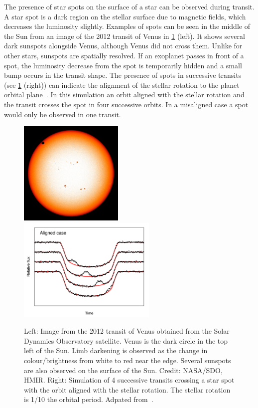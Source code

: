 The presence of star spots on the surface of a star can be observed during transit.
A star spot is a dark region on the stellar surface due to magnetic fields, which decreases the luminosity slightly.
Examples of spots can be seen in the middle of the Sun from an image of the 2012 transit of Venus in \cref{fig:transit_venus_transit_alignment} (left).
It shows several dark sunspots alongside Venus, although Venus did not cross them.
Unlike for other stars, sunspots are spatially resolved.
If an exoplanet passes in front of a spot, the luminosity decrease from the spot is temporarily hidden and a small bump occurs in the transit shape.
The presence of spots in successive transits (see \cref{fig:transit_venus_transit_alignment} (right)) can indicate the alignment of the stellar rotation to the planet orbital plane~\citep{sanchis-ojeda_starspots_2013}.
In this simulation an orbit aligned with the stellar rotation and the transit crosses the spot in four successive orbits.
In a misaligned case a spot would only be observed in one transit.

\begin{figure}
    \centering
    \includegraphics[height=5cm]{./figures/introduction/SDO_2012_Venus_Transit.jpg}
    \includegraphics[height=5cm]{figures/introduction/sanchisojedafig1-crop.pdf}
    \caption{Left: Image from the 2012 transit of Venus obtained from the Solar Dynamics Observatory satellite.
        Venus is the dark circle in the top left of the Sun.
        Limb darkening is observed as the change in colour/brightness from white to red near the edge.
        Several sunspots are also observed on the surface of the Sun.
        Credit: NASA/SDO, HMIR.
        Right: Simulation of 4 successive transits crossing a star spot with the orbit aligned with the stellar rotation.
        The stellar rotation is 1/10 the orbital period.
        Adpated from~\citet[][Figure~1]{sanchis-ojeda_starspots_2013}.}
    \label{fig:transit_venus_transit_alignment}
\end{figure}


